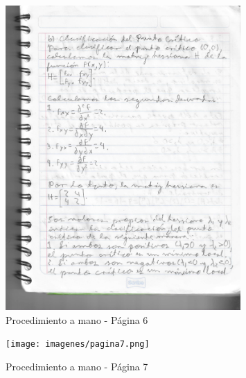 \documentclass{article}
\begin{document}
\begin{figure}[H]
	\centering
	\includegraphics[width=0.8\textwidth]{imagenes/pagina6.png}
	\caption{Procedimiento a mano - Página 6}
	\label{fig:procedimiento_6}
\end{figure}

\begin{figure}[H]
	\centering
	\texttt{[image: imagenes/pagina7.png]}
	\caption{Procedimiento a mano - Página 7}
	\label{fig:procedimiento_7}
\end{figure}


\end{document}
